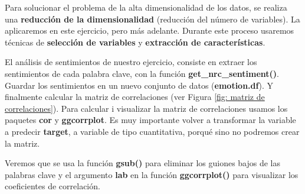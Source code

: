 \documentclass[]{article}
\newenvironment{Shaded}{\begin{snugshade}}{\end{snugshade}}
\newcommand{\CharTok}[1]{\textcolor[rgb]{0.31,0.60,0.02}{#1}}
\newcommand{\DataTypeTok}[1]{\textcolor[rgb]{0.13,0.29,0.53}{#1}}
\newcommand{\DecValTok}[1]{\textcolor[rgb]{0.00,0.00,0.81}{#1}}
\newcommand{\KeywordTok}[1]{\textcolor[rgb]{0.13,0.29,0.53}{\textbf{#1}}}
\newcommand{\NormalTok}[1]{#1}
\newcommand{\OperatorTok}[1]{\textcolor[rgb]{0.81,0.36,0.00}{\textbf{#1}}}
\newcommand{\OtherTok}[1]{\textcolor[rgb]{0.56,0.35,0.01}{#1}}
\newcommand{\StringTok}[1]{\textcolor[rgb]{0.31,0.60,0.02}{#1}}
\begin{document}
Para solucionar el problema de la alta dimensionalidad de los datos, se realiza una \textbf{reducción de la dimensionalidad} (reducción del número de variables). La aplicaremos en este ejercicio, pero más adelante. Durante este proceso usaremos técnicas de \textbf{selección de variables} y \textbf{extracción de características}.

El análisis de sentimientos de nuestro ejercicio, consiste en extraer los sentimientos de cada palabra clave, con la función \textbf{get\_nrc\_sentiment()}. Guardar los sentimientos en un nuevo conjunto de datos (\textbf{emotion.df}). Y finalmente calcular la matriz de correlaciones (ver Figura \ref{fig: matriz de correlaciones}). Para calcular i visualizar la matriz de correlaciones usamos los paquetes \textbf{cor} y \textbf{ggcorrplot}. Es muy importante volver a transformar la variable a predecir \textbf{target}, a variable de tipo cuantitativa, porqué sino no podremos crear la matriz.

Veremos que se usa la función \textbf{gsub()} para eliminar los guiones bajos de las palabras clave y el argumento \textbf{lab} en la función \textbf{ggcorrplot()} para visualizar los coeficientes de correlación.

\vspace{3mm}


\begin{Shaded}
\end{Shaded}
\end{document}
